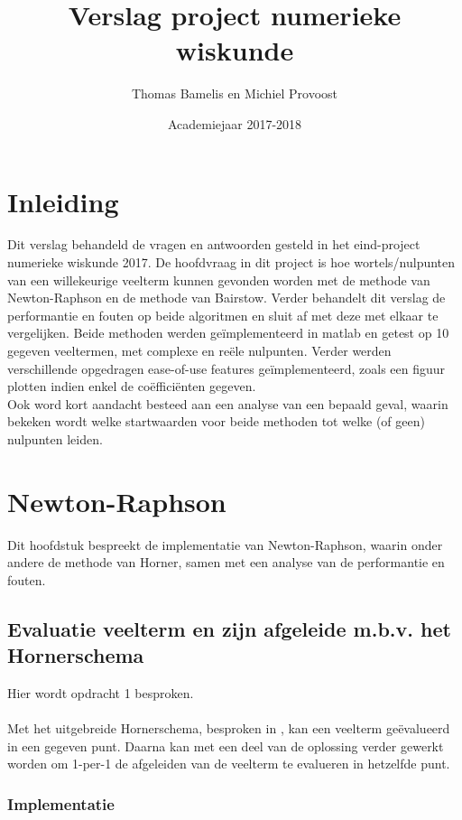 \documentclass[a4paper,kulak]{kulakarticle}
\date{Academiejaar 2017-2018}
\title{Verslag project numerieke wiskunde}
\author{Thomas Bamelis en Michiel Provoost}
\begin{document}
\maketitle

\section*{Inleiding}

Dit verslag behandeld de vragen en antwoorden gesteld in het eind-project numerieke wiskunde 2017. De hoofdvraag in dit project is hoe wortels/nulpunten van een willekeurige veelterm kunnen gevonden worden met de methode van Newton-Raphson en de methode van Bairstow. Verder behandelt dit verslag de performantie en fouten op beide algoritmen en  sluit af met deze met elkaar te vergelijken. Beide methoden werden geïmplementeerd in matlab en getest op 10 gegeven veeltermen, met complexe en reële nulpunten. 
Verder werden verschillende opgedragen ease-of-use features geïmplementeerd, zoals een figuur plotten indien enkel de coëfficiënten gegeven.\\
Ook word kort aandacht besteed aan een analyse van een bepaald geval, waarin bekeken wordt welke startwaarden voor beide methoden tot welke (of geen) nulpunten leiden.

\section{Newton-Raphson}
Dit hoofdstuk bespreekt de implementatie van Newton-Raphson, waarin onder andere de methode van Horner, samen met een analyse van de performantie en fouten.

\subsection{Evaluatie veelterm en zijn afgeleide m.b.v. het Hornerschema}
Hier wordt opdracht 1 besproken. \label{sec:horUit} \\~\\
Met het uitgebreide Hornerschema, besproken in \cite{bultheel2006inleiding}, kan een veelterm geëvalueerd in een gegeven punt. Daarna kan met een deel van de oplossing verder gewerkt worden om 1-per-1 de afgeleiden van de veelterm te evalueren in hetzelfde punt.\\

\subsubsection{Implementatie}
\end{document}
